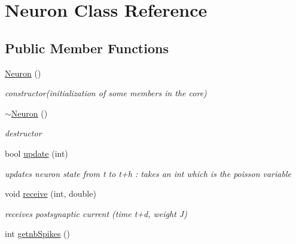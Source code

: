 \hypertarget{classNeuron}{\section{Neuron Class Reference}
\label{classNeuron}
}
\subsection*{Public Member Functions}
\begin{DoxyCompactItemize}
\item 
\hypertarget{classNeuron_a823487d01615fadb8ac19a2768dd9d96}{\hyperlink{classNeuron_a823487d01615fadb8ac19a2768dd9d96}{Neuron} ()}\label{classNeuron_a823487d01615fadb8ac19a2768dd9d96}

\begin{DoxyCompactList}\small\item\em constructor(initialization of some members in the core) \end{DoxyCompactList}\item 
\hypertarget{classNeuron_a94a250ce7e167760e593979b899745b1}{\hyperlink{classNeuron_a94a250ce7e167760e593979b899745b1}{$\sim$\-Neuron} ()}\label{classNeuron_a94a250ce7e167760e593979b899745b1}

\begin{DoxyCompactList}\small\item\em destructor \end{DoxyCompactList}\item 
\hypertarget{classNeuron_aa599028cf83269487c72b3c7add5fa6a}{bool \hyperlink{classNeuron_aa599028cf83269487c72b3c7add5fa6a}{update} (int)}\label{classNeuron_aa599028cf83269487c72b3c7add5fa6a}

\begin{DoxyCompactList}\small\item\em updates neuron state from t to t+h \-: takes an int which is the poisson variable \end{DoxyCompactList}\item 
\hypertarget{classNeuron_a0f794db12711a961e7be31307e8940fd}{void \hyperlink{classNeuron_a0f794db12711a961e7be31307e8940fd}{receive} (int, double)}\label{classNeuron_a0f794db12711a961e7be31307e8940fd}

\begin{DoxyCompactList}\small\item\em receives postsynaptic current (time t+d, weight J) \end{DoxyCompactList}\item 
\hypertarget{classNeuron_affb0899ac310398da71c5d3fdb1777a5}{int \hyperlink{classNeuron_affb0899ac310398da71c5d3fdb1777a5}{getnb\-Spikes} ()}\label{classNeuron_affb0899ac310398da71c5d3fdb1777a5}


\end{DoxyCompactItemize}
